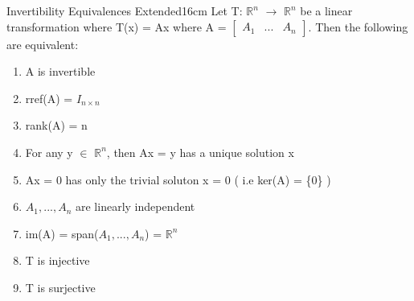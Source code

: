     \begin{wtheorem}{Invertibility Equivalences Extended}{16cm}
        Let T: $\mathbb{R}^n$ $\rightarrow$ $\mathbb{R}^n$
        be a linear transformation where T(x) = Ax
        where A =
        $\begin{bmatrix}
            A_1 & ... & A_n
        \end{bmatrix}$.
        Then the following are equivalent:

        \begin{enumerate}[label=(\alph*), leftmargin=1cm, itemsep=0.1cm]
            \item A is invertible
            
            \item rref(A) = $I_{n \times n}$
            
            \item rank(A) = n
            
            \item For any y $\in$ $\mathbb{R}^n$, then Ax = y
                has a unique solution x

            \item Ax = 0 has only the trivial soluton x = 0
                \hspace{0.5cm}
                ( i.e ker(A) = \{0\} )
        
            \item $A_1,...,A_n$ are linearly independent
            
            \item im(A) = span($A_1,...,A_n$) = $\mathbb{R}^n$
            
            \item T is injective
            
            \item T is surjective
        \end{enumerate}
    \end{wtheorem}

